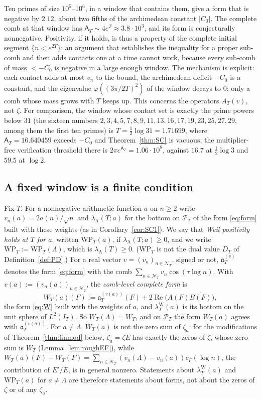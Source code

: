 \documentclass[11pt]{amsart}
\theoremstyle{definition}
\theoremstyle{remark}
\newcommand{\Rel}{\operatorname{Re}}
\newcommand{\PT}{\mathcal P_T}
\newcommand{\IT}{I_T}
\newcommand{\lamA}{\lambda_{\mathrm A}(T)}
\newcommand{\cF}{c_F}
\newcommand{\NT}{\mathcal N_T}
\newcommand{\Aconst}{\mathsf A_T}
\begin{document}
Ten primes of size $10^5$--$10^6$, in a window that contains them, give a form that is negative by
$2.12$, about two fifths of the archimedean constant $|C_0|$. The complete comb at that window has
$\Aconst\sim4e^T\approx3.8\cdot10^3$, and its form is conjecturally nonnegative. Positivity, if it
holds, is thus a property of the complete initial segment $\{n<e^{2T}\}$: an argument that
establishes the inequality for a proper sub-comb and then adds contacts one at a time cannot work,
because every sub-comb of mass $<-C_0$ is negative in a large enough window. The mechanism is
explicit: each contact adds at most $v_n$ to the bound, the archimedean deficit $-C_0$ is a
constant, and the eigenvalue $\varphi((3\pi/2T)^2)$ of the window decays to $0$; only a comb whose
mass grows with $T$ keeps up. This concerns the operators $A_T(v)$, not $\zeta$. For comparison, the
window whose contact set is exactly the prime powers below $31$ (the sixteen numbers
$2,3,4,5,7,8,9,11,13,16,17,19,23,25,27,29$, among them the first ten primes) is
$T=\frac12\log31=1.71699$, where $\Aconst=16.640459$ exceeds $-C_0$ and Theorem~\ref{thm:SC} is
vacuous; the multiplier-free verification threshold there is
$2\pi e^{\Aconst}=1.06\cdot10^8$, against $16.7$ at $\frac12\log3$ and $59.5$ at $\log2$.



\subsection{A fixed window is a finite condition}\label{subsec:finite}
Fix $T$. For a nonnegative arithmetic function $a$ on $n\ge2$ write $v_n(a)=2a(n)/\sqrt n$ and
$\lambda_{\mathrm A}(T;a)$ for the bottom on $\PT$ of the form \eqref{eq:form} built with these weights
(as in Corollary~\ref{cor:SC1}). We say that \emph{Weil positivity holds at $T$ for $a$}, written
$\mathrm{WP}_T(a)$, if $\lambda_{\mathrm A}(T;a)\ge0$, and we write $\mathrm{WP}_T:=\mathrm{WP}_T(\Lambda)$, which is
$\lamA\ge0$. ($\mathrm{WP}_T$ is not the dual value $D_T$ of Definition~\ref{def:PD}.) For a real vector
$v=(v_n)_{n\in\NT}$, signed or not, $\mathfrak a^{(v)}_T$ denotes the form \eqref{eq:form} with the comb
$\sum_{n\in\NT}v_n\cos(\tau\log n)$. With $v(a):=(v_n(a))_{n\in\NT}$, the \emph{comb-level complete form} is
\[
W_T(a)(F):=\mathfrak a^{(v(a))}_T(F)+2\Rel\big(A(F)\overline{B(F)}\big),
\]
the form \eqref{eq:W} built with the weights of $a$, and $\lambda^{\mathrm W}_T(a)$ is its bottom on the unit sphere of
$L^2(\IT)$. So $W_T(\Lambda)=W_T$, and on $\PT$ the form $W_T(a)$ agrees with $\mathfrak a^{(v(a))}_T$. For
$a\ne\Lambda$, $W_T(a)$ is not the zero sum of $\zeta_a$: for the modifications of Theorem~\ref{thm:finmod}
below, $\zeta_a=\zeta E$ has exactly the zeros of $\zeta$, whose zero sum is $W_T$ (Lemma~\ref{lem:roughEF}),
while $W_T(a)(F)-W_T(F)=\sum_{n\in\NT}(v_n(\Lambda)-v_n(a))\cF(\log n)$, the contribution of $E'/E$, is in
general nonzero. Statements about $\lambda^{\mathrm W}_T(a)$ and $\mathrm{WP}_T(a)$ for $a\ne\Lambda$ are therefore
statements about forms, not about the zeros of $\zeta$ or of any $\zeta_a$.
\end{document}
